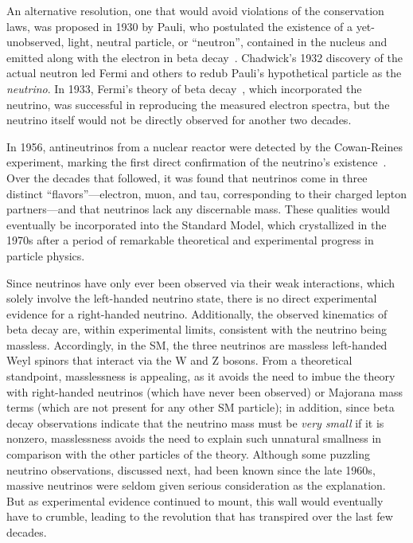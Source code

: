 \documentclass[../thesis.tex]{subfiles}
\begin{document}
An alternative resolution, one that would avoid violations of the conservation laws, was proposed in 1930 by Pauli, who postulated the existence of a yet-unobserved, light, neutral particle, or ``neutron'', contained in the nucleus and emitted along with the electron in beta decay~\cite{Pauli:83282}. Chadwick's 1932 discovery of the actual neutron led Fermi and others to redub Pauli's hypothetical particle as the \emph{neutrino}. In 1933, Fermi's theory of beta decay~\cite{Fermi1934TentativoDU}, which incorporated the neutrino, was successful in reproducing the measured electron spectra, but the neutrino itself would not be directly observed for another two decades.

In 1956, antineutrinos from a nuclear reactor were detected by the Cowan-Reines experiment, marking the first direct confirmation of the neutrino's existence~\cite{Cowan103}. Over the decades that followed, it was found that neutrinos come in three distinct ``flavors''---electron, muon, and tau, corresponding to their charged lepton partners---and that neutrinos lack any discernable mass. These qualities would eventually be incorporated into the Standard Model, which crystallized in the 1970s after a period of remarkable theoretical and experimental progress in particle physics.

Since neutrinos have only ever been observed via their weak interactions, which solely involve the left-handed neutrino state, there is no direct experimental evidence for a right-handed neutrino. Additionally, the observed kinematics of beta decay are, within experimental limits, consistent with the neutrino being massless. Accordingly, in the SM, the three neutrinos are massless left-handed Weyl spinors that interact via the W and Z bosons. From a theoretical standpoint, masslessness is appealing, as it avoids the need to imbue the theory with right-handed neutrinos (which have never been observed) or Majorana mass terms (which are not present for any other SM particle); in addition, since beta decay observations indicate that the neutrino mass must be \emph{very small} if it is nonzero, masslessness avoids the need to explain such unnatural smallness in comparison with the other particles of the theory. Although some puzzling neutrino observations, discussed next, had been known since the late 1960s, massive neutrinos were seldom given serious consideration as the explanation. But as experimental evidence continued to mount, this wall would eventually have to crumble, leading to the revolution that has transpired over the last few decades.
\end{document}
